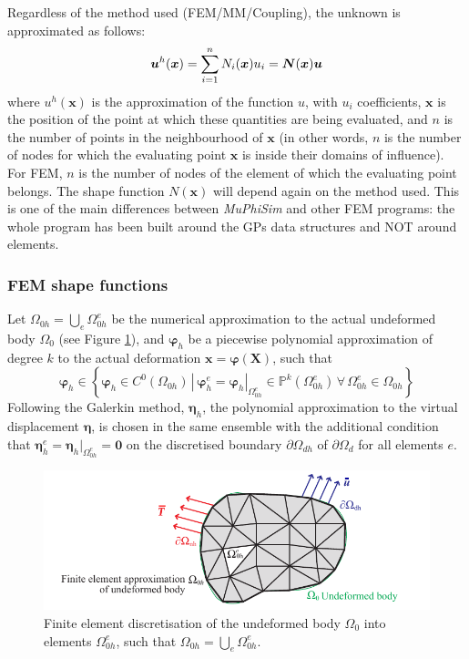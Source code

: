 \documentclass[oneside,11pt,times]{book}
\begin{document}
Regardless of the method used (FEM/MM/Coupling), the unknown is approximated as follows:
\begin{equation}\label{eq:2}
\centering
\bm{u}^h(\bm{x})=\sum\limits_{i=1}^n N_i(\bm{x})u_i = \bm{N}(\bm{x})\bm{u}
\end{equation}
where $u^h(\bm{x})$ is the approximation of the function $u$, with $u_i$ coefficients, $\bm{x}$ is the position of the point at which these quantities are being evaluated, and $n$ is the number of points in the neighbourhood of $\bm{x}$ (in other words, $n$ is the number of nodes for which the evaluating point $\bm{x}$ is inside their domains of influence). For FEM, $n$ is the number of nodes of the element of which the evaluating point belongs. The shape function $N(\bm{x})$ will depend again on the method used. This is one of the main differences between \textit{MuPhiSim} and other FEM programs: the whole program has been built around the GPs data structures and NOT around elements.

\subsubsection{FEM shape functions}
Let $\Omega_{0h} = \bigcup_e \Omega_{0h}^e$ be the numerical approximation to the actual undeformed body $\Omega_0$ (see Figure \ref{figureFiniteElementDiscretisation}), and $\bm{\varphi}_h$ be a piecewise polynomial approximation of degree $k$ to the actual deformation $\bm{x} = \bm{\varphi}(\bm{X})$, such that
%
\begin{equation} \label{equationSolutionApproximation}
 \bm{\varphi}_h \in \left\{ \bm{\varphi}_h \in C^0(\Omega_{0h}) \, | \, \bm{\varphi}_h^e=\bm{\varphi}_h|_{\Omega_{0h}^e} \in \mathbb{P}^k (\Omega_{0h}^e) \, \forall \, \Omega_{0h}^e \in \Omega_{0h} \right\}
\end{equation}
%
Following the Galerkin method, $\bm{\eta}_h$, the polynomial approximation to the virtual displacement $\bm{\eta}$, is chosen in the same ensemble with the additional condition that $\bm{\eta}^e_h=\bm{\eta}_h|_{\Omega_{0h}^e} = \bm{0}$ on the discretised boundary $\partial \Omega_{dh}$ of $\partial \Omega_d$ for all elements $e$.
%

\begin{figure}[h!]
 \includegraphics[scale=1.0]{imgs/SpatialDiscretisation/FiniteElementDiscretisation.pdf}
 \caption{Finite element discretisation of the undeformed body $\Omega_0$ into elements $\Omega_{0h}^e$, such that $\Omega_{0h} = \bigcup_e \Omega_{0h}^e$.}
 \label{figureFiniteElementDiscretisation}
\end{figure}
\end{document}
